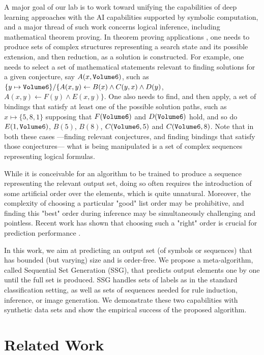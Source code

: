 \documentclass[letterpaper]{article}
\newcommand{\citep}{\cite}
\begin{document}
A major goal of our lab is to work toward unifying the capabilities of deep learning approaches with the AI capabilities supported by symbolic computation, and a major thread of such work concerns logical inference, including mathematical theorem proving. In theorem proving applications \cite{irving2016deepmath}, one needs to produce sets of complex structures representing a search state and its possible extension, and then reduction, as a solution is constructed. For example, one needs to select a set of mathematical statements relevant to finding solutions for a given conjecture, say $A(x,{\tt Volume6})$, such as $\{y\mapsto {\tt Volume6}\} \slash \{A(x,y) \leftarrow B(x) \wedge C(y,x) \wedge D(y)$,  $A(x,y) \leftarrow F(y) \wedge E(x,y)\}$. One also needs to find, and then apply, a set of bindings that satisfy at least one of the possible solution paths, such as $x\mapsto\{5,8,1\}$ supposing that $F({\tt Volume6})$ and $D({\tt Volume6})$ hold, and so do $E(1,{\tt Volume6})$, $B(5)$, $B(8)$, $C({\tt Volume6},5)$ and $C({\tt Volume6},8)$. Note that in both these cases ---finding relevant conjectures, and finding bindings that satisfy those conjectures--- what is being manipulated is a set of complex sequences representing logical formulas.

While it is conceivable for an algorithm to be trained to produce a sequence representing the relevant output set, doing so often requires the introduction of some artificial order over the elements, which is quite unnatural. Moreover, the complexity of choosing a particular "good" list order may be prohibitive, and finding this "best" order during inference may be simultaneously challenging and pointless. Recent work has shown that choosing such a "right" order is crucial for prediction performance \citep{order_matters}.

In this work, we aim at predicting an output set (of symbols or sequences) that has bounded (but varying) size and is order-free. We propose a meta-algorithm, called Sequential Set Generation (SSG), that predicts output elements one by one until the full set is produced. SSG handles sets of labels as in the standard classification setting, as well as sets of sequences needed for rule induction, inference, or image generation. We demonstrate these two capabilities with synthetic data sets and show the empirical success of the proposed algorithm.



\medskip

\section{Related Work}
\end{document}
